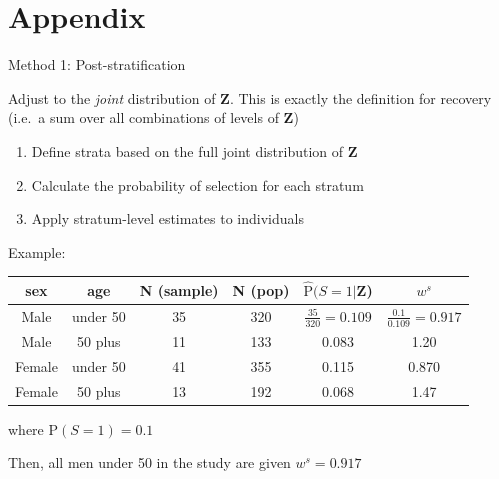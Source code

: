\documentclass[
  ignorenonframetext,
]{beamer}
\providecommand{\tightlist}{%
  \setlength{\itemsep}{0pt}\setlength{\parskip}{0pt}}
\begin{document}
\hypertarget{appendix}{%
\section{Appendix}\label{appendix}}

\begin{frame}{Method 1: Post-stratification}
\protect\hypertarget{method-1-post-stratification}{}

Adjust to the \emph{joint} distribution of \(\mathbf{Z}\). This is
exactly the definition for recovery (i.e.~a sum over all combinations of
levels of \(\mathbf{Z}\))

\begin{enumerate}
\tightlist
\item
  Define strata based on the full joint distribution of \(\mathbf{Z}\)
\item
  Calculate the probability of selection for each stratum
\item
  Apply stratum-level estimates to individuals
\end{enumerate}

Example:

\begin{table}[H]
\small
    \centering
    \begin{tabular}{|c c | c c |c | c|}
    \hline
    \textbf{sex} & \textbf{age} & \textbf{N (sample)} & \textbf{N (pop)} & $\hat{\text{P}}(S = 1 | \mathbf{Z}$) & $w^s$\\
    \hline
    Male & under 50 & 35 & 320 & $\frac{35}{320} = 0.109$ & $\frac{0.1}{0.109} = 0.917$\\
    Male & 50 plus & 11 & 133 & 0.083 & 1.20\\
    Female & under 50 & 41 & 355 & 0.115 & 0.870\\
    Female & 50 plus & 13 & 192 & 0.068 & 1.47\\
    \hline
    \end{tabular}
\end{table}

where \(\text{P}(S = 1) = 0.1\)

Then, all men under 50 in the study are given \(w^s = 0.917\)

\end{frame}
\end{document}
